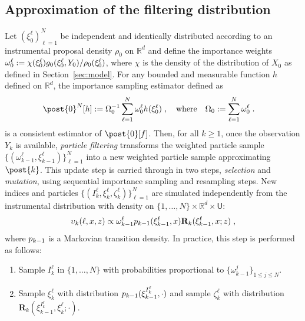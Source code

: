 \documentclass[12pt]{article}
\newcommand{\md}[1]{g_{#1}}
\newcommand{\N}{N}
\newcommand{\kissforward}[3][]
{\ifthenelse{\equal{#1}{}}{p_{#2}}
{\ifthenelse{\equal{#1}{fully}}{p^{\star}_{#2}}
{\ifthenelse{\equal{#1}{smooth}}{\tilde{r}_{#2}}{\mathrm{erreur}}}}}
\newcommand{\instrpostaux}[1]{\ensuremath{\upsilon_{#1}}}
\newcommand{\XinitIS}[2][]
{\ifthenelse{\equal{#1}{}}{\ensuremath{\rho_{#2}}}{\ensuremath{\check{\rho}_{#2}}}}
\newcommand{\adjfuncforward}[1]{\vartheta_{#1}}
\newcommand{\eqdef}{\ensuremath{:=}}
\newcommand{\eqsp}{\;}
\newcommand{\ewght}[2]{\ensuremath{\omega_{#1}^{#2}}}
\newcommand{\epart}[2]{\ensuremath{\xi_{#1}^{#2}}}
\newcommand{\Xinit}{\ensuremath{\chi}}
\newcommand{\sumwght}[2][]{%
\ifthenelse{\equal{#1}{}}{\ensuremath{\Omega_{#2}}}{\ensuremath{\Omega_{#2}^{(#1)}}}}
\newcommand{\marginalset}{\mathsf{U}}
\newcommand{\kernelmarg}{\mathbf{R}}
\begin{document}
\subsection{Approximation of the filtering distribution}
\label{sec:filtering}
Let $(\epart{0}{\ell})_{\ell = 1}^\N$ be independent and identically distributed according to an instrumental proposal density $\rho_0$ on $\mathbb{R}^d$ and define the importance weights $\ewght{0}{\ell} \eqdef \Xinit(\epart{0}{\ell})\md{0}(\epart{0}{\ell},Y_{0})/\XinitIS{0}(\epart{0}{\ell})$, where $\chi$ is the density of the distribution of $X_0$ as defined in Section~\ref{sec:model}. 
For any bounded and measurable function  $h$ defined on $\mathbb{R}^d$, the importance sampling estimator defined as 
\begin{align*}
\post{0}^\N[h]&\eqdef \sumwght{0}^{-1}\sum_{\ell=1}^\N \ewght{0}{\ell}h(\epart{0}{\ell})\eqsp,\quad\mbox{where}\quad\sumwght{0}\eqdef \sum_{\ell=1}^N \ewght{0}{\ell}\eqsp.
\end{align*}
is a consistent estimator of $\post{0}[f]$. 
Then, for all $k\geqslant 1$, once the observation $Y_k$ is available, \textit{particle filtering} transforms the weighted particle sample $\{(\ewght{k-1}{\ell},\epart{k-1}{\ell})\}_{\ell=1}^{\N}$ into a new weighted particle sample approximating $\post{k}$.
 This update step is carried through in two steps, \emph{selection} and \emph{mutation},  using sequential importance sampling and resampling steps.   
 New indices and particles $\{ (I_k^{\ell}, \epart{k}{\ell},\zeta_k^{\ell}) \}_{\ell = 1}^\N$ are simulated independently from the instrumental distribution with density on $\{1, \dots, \N\} \times \mathbb{R}^d\times \marginalset$:
$$
\instrpostaux{k}(\ell,x,z) \propto \ewght{k-1}{\ell} 
\kissforward{k-1}{k-1}(\epart{k-1}{\ell},x) \kernelmarg_{k}(\epart{k-1}{\ell},x;z) \eqsp,
$$
where 
$\kissforward{k-1}{k-1}$ is a Markovian transition density.  In practice, this step is performed as follows:
\begin{enumerate}
\item Sample $I_k^{\ell}$ in $\{1,\ldots,N\}$ with probabilities proportional to $\{\ewght{k-1}{j}
\}_{1\leqslant j\leqslant \N}$.
\item Sample $\epart{k}{\ell}$ with distribution $\kissforward{k-1}{k-1}(\epart{k-1}{I_k^{\ell}},\cdot)$ and sample $\zeta_k^{\ell}$ with distribution $\kernelmarg_{k}(\epart{k-1}{I_k^{\ell}},\epart{k}{\ell};\cdot)$.
\end{enumerate} 
\end{document}
